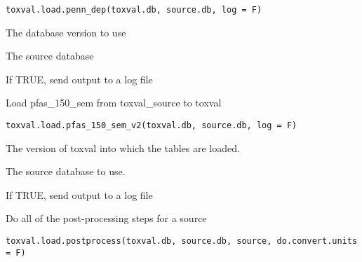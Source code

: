 \documentclass[letterpaper]{book}
\begin{document}
%
\begin{Usage}
\begin{verbatim}
toxval.load.penn_dep(toxval.db, source.db, log = F)
\end{verbatim}
\end{Usage}
%
\begin{Arguments}
\begin{ldescription}
\item[\code{toxval.db}] The database version to use

\item[\code{source.db}] The source database

\item[\code{log}] If TRUE, send output to a log file
\end{ldescription}
\end{Arguments}
%
\begin{Description}\relax
Load pfas\_150\_sem from toxval\_source to toxval
\end{Description}
%
\begin{Usage}
\begin{verbatim}
toxval.load.pfas_150_sem_v2(toxval.db, source.db, log = F)
\end{verbatim}
\end{Usage}
%
\begin{Arguments}
\begin{ldescription}
\item[\code{toxval.db}] The version of toxval into which the tables are loaded.

\item[\code{source.db}] The source database to use.

\item[\code{log}] If TRUE, send output to a log file
\end{ldescription}
\end{Arguments}
%
\begin{Description}\relax
Do all of the post-processing steps for a source
\end{Description}
%
\begin{Usage}
\begin{verbatim}
toxval.load.postprocess(toxval.db, source.db, source, do.convert.units = F)
\end{verbatim}
\end{Usage}
\end{document}
